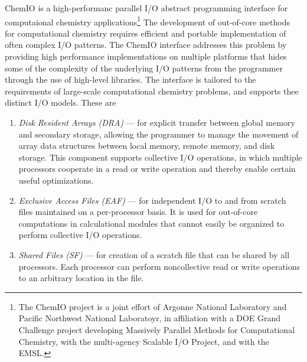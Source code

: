 \label{sec:ChemIO}


ChemIO is a high-performanc parallel I/O abstract programming interface for
computaional chemistry applications\footnote{The ChemIO project is a joint effort of
Argonne National Laboratory and Pacific Northwest National Laboratoyr, in affiliation
with a DOE Grand Challenge project developing Massively Parallel Methods for
Computational Chemistry, with the multi-agency Scalable I/O Project, and with
the EMSL.}
The development of out-of-core methods for 
computational chemistry requires efficient and portable implementation of often complex 
I/O patterns.  The ChemIO interface addresses this problem by providing high
performance implementations on multiple platforms that hides some of the
complexity of the underlying I/O patterns from the programmer through the use of
high-level libraries.  The interface is tailored to the requirements of
large-scale computational chemistry problems, and supports thee distinct
I/O models.  These are

\begin{enumerate}
\item {\em Disk Resident Arrays (DRA)} --- for explicit transfer between global
memory and secondary storage, allowing the programmer to manage the movement of array
data structures between local memory, remote memory, and disk storage.  This component
supports collective I/O operations, in which multiple processors cooperate in 
a read or write operation and thereby enable certain useful optimizations.

\item {\em Exclusive Access Files (EAF)} --- for independent I/O to and from
scratch files maintained on a per-processor basis.  It is used for out-of-core
computations in calculational modules that cannot easily be organized to perform collective I/O
operations.

\item {\em Shared Files (SF)} --- for creation of a scratch file that can be
shared by all processors.  Each processor can perform noncollective read or write
operations to an arbitrary location in the file.

\end{enumerate}


